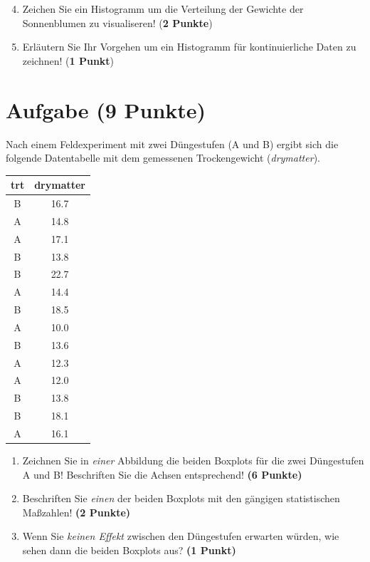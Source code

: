 \documentclass[a4paper, 10pt]{scrartcl}\usepackage[]{graphicx}\usepackage[]{xcolor}
\begin{document}
\begin{enumerate}
  \setcounter{enumi}{3}
\item Zeichen Sie ein Histogramm um die Verteilung der Gewichte der
  Sonnenblumen zu visualiseren! (\textbf{2 Punkte})
\item Erl{\"a}utern Sie Ihr Vorgehen um ein Histogramm f{\"u}r kontinuierliche
  Daten zu zeichnen!  (\textbf{1 Punkt})
 \end{enumerate} 
\clearpage

\section{Aufgabe \hfill (9 Punkte)}

Nach einem Feldexperiment mit zwei D{\"u}ngestufen (A und B) ergibt sich die
folgende Datentabelle mit dem gemessenen Trockengewicht (\textit{drymatter}). 

\begin{table}[!h]
\centering
\begin{tabular}{cc}
\toprule
trt & drymatter\\
\midrule
B & 16.7\\
A & 14.8\\
A & 17.1\\
B & 13.8\\
B & 22.7\\
\addlinespace
A & 14.4\\
B & 18.5\\
A & 10.0\\
B & 13.6\\
A & 12.3\\
\addlinespace
A & 12.0\\
B & 13.8\\
B & 18.1\\
A & 16.1\\
\bottomrule
\end{tabular}
\end{table}



\begin{enumerate}
\item Zeichnen Sie in \textit{einer} Abbildung die beiden Boxplots f{\"u}r die
  zwei D{\"u}ngestufen A und B! Beschriften Sie die Achsen entsprechend!
  \textbf{(6 Punkte)}
\item Beschriften Sie \textit{einen} der beiden Boxplots mit den g{\"a}ngigen
  statistischen Ma{\ss}zahlen! \textbf{(2 Punkte)}
\item Wenn Sie \textit{keinen Effekt} zwischen den D{\"u}ngestufen erwarten
  w{\"u}rden, wie sehen dann die beiden Boxplots aus? \textbf{(1 Punkt)}
\end{enumerate} 
\clearpage
\end{document}

